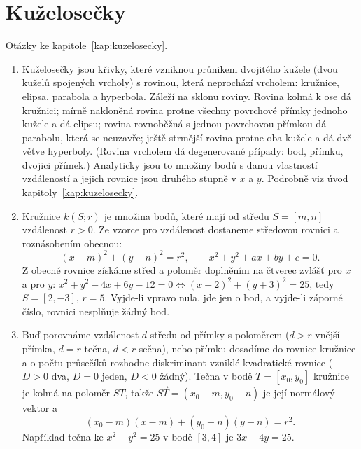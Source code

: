 \section{Kuželosečky}

Otázky ke kapitole~\ref{kap:kuzelosecky}.

\begin{enumerate}[label=\textbf{\arabic*.}, leftmargin=*, itemsep=0.8em]
  \item {}
  Kuželosečky jsou křivky, které vzniknou průnikem dvojitého kužele (dvou kuželů spojených vrcholy) s rovinou, která neprochází vrcholem: kružnice, elipsa, parabola a hyperbola. Záleží na sklonu roviny. Rovina kolmá k ose dá kružnici; mírně nakloněná rovina protne všechny povrchové přímky jednoho kužele a dá elipsu; rovina rovnoběžná s jednou povrchovou přímkou dá parabolu, která se neuzavře; ještě strmější rovina protne oba kužele a dá dvě větve hyperboly. (Rovina vrcholem dá degenerované případy: bod, přímku, dvojici přímek.) Analyticky jsou to množiny bodů s danou vlastností vzdáleností a jejich rovnice jsou druhého stupně v $x$ a $y$. Podrobně viz úvod kapitoly~\ref{kap:kuzelosecky}.

  \item {}
  Kružnice $k(S; r)$ je množina bodů, které mají od středu $S = [m, n]$ vzdálenost $r > 0$. Ze vzorce pro vzdálenost dostaneme středovou rovnici a roznásobením obecnou:
  \begin{equation*}
    {(x - m)}^2 + {(y - n)}^2 = r^2, \qquad x^2 + y^2 + ax + by + c = 0.
  \end{equation*}
  Z obecné rovnice získáme střed a poloměr doplněním na čtverec zvlášť pro $x$ a pro $y$: $x^2 + y^2 - 4x + 6y - 12 = 0 \Leftrightarrow {(x - 2)}^2 + {(y + 3)}^2 = 25$, tedy $S = [2, -3]$, $r = 5$. Vyjde-li vpravo nula, jde jen o bod, a vyjde-li záporné číslo, rovnici nesplňuje žádný bod. 

  \item {}
  Buď porovnáme vzdálenost $d$ středu od přímky s poloměrem ($d > r$ vnější přímka, $d = r$ tečna, $d < r$ sečna), nebo přímku dosadíme do rovnice kružnice a o počtu průsečíků rozhodne diskriminant vzniklé kvadratické rovnice ($D > 0$ dva, $D = 0$ jeden, $D < 0$ žádný). Tečna v bodě $T = [x_0, y_0]$ kružnice je kolmá na poloměr $ST$, takže $\overrightarrow{ST} = (x_0 - m, y_0 - n)$ je její normálový vektor a
  \begin{equation*}
    (x_0 - m)(x - m) + (y_0 - n)(y - n) = r^2.
  \end{equation*}
  Například tečna ke $x^2 + y^2 = 25$ v bodě $[3, 4]$ je $3x + 4y = 25$. 


\end{enumerate}
